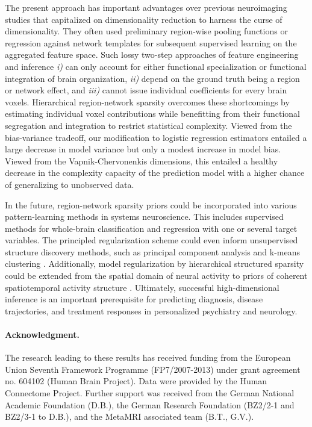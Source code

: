 \documentclass{article} %
\begin{document}
The present approach has important advantages over previous
neuroimaging studies that capitalized on dimensionality reduction to harness
the curse of dimensionality.
They often used preliminary region-wise pooling functions
or regression against network templates
for subsequent supervised learning on the aggregated feature space.
Such lossy two-step approaches of feature engineering and inference
\textit{i)} can only account for either functional specialization or
functional integration of brain organization,
\textit{ii)} depend on the ground truth being a region or network effect,
and
\textit{iii)} cannot issue individual coefficients for every brain voxels.
%
Hierarchical region-network sparsity overcomes these shortcomings
by estimating individual voxel contributions
while benefitting from their functional segregation and integration
to restrict statistical complexity.
%
Viewed from the bias-variance tradeoff,
our modification to logistic regression estimators
entailed a large decrease in model variance but only a modest
increase in model bias.
Viewed from the Vapnik-Chervonenkis dimensions,
this entailed a healthy decrease in the complexity capacity of the prediction model
with a higher chance of generalizing to unobserved data.



In the future,
region-network sparsity priors could be incorporated into various
pattern-learning methods in systems neuroscience.
%
This includes supervised methods for whole-brain classification and regression
with one or several target variables.
The principled regularization scheme could even inform
unsupervised structure discovery methods,
such as principal component analysis
\cite{jenatton2009structured}
and
k-means clustering \cite{witten2010framework}.
%
Additionally,
model regularization by hierarchical structured sparsity could be extended
from the spatial domain of neural activity to
priors of coherent spatiotemporal activity structure
\cite{gramfort2011tracking}.
%
Ultimately,
successful high-dimensional inference is
an important prerequisite
for predicting diagnosis,
disease trajectories, and treatment responses
in personalized psychiatry and neurology.



\paragraph{Acknowledgment.}
{\small The research leading to these results has received funding from the
European Union Seventh Framework Programme (FP7/2007-2013)
under grant agreement no. 604102 (Human Brain Project).
Data were provided by the Human Connectome Project.
Further support was received from
the German National Academic Foundation (D.B.),
the German Research Foundation (BZ2/2-1 and BZ2/3-1 to D.B.),
and the MetaMRI associated team (B.T., G.V.).
}

  
\small
% 


\end{document}
